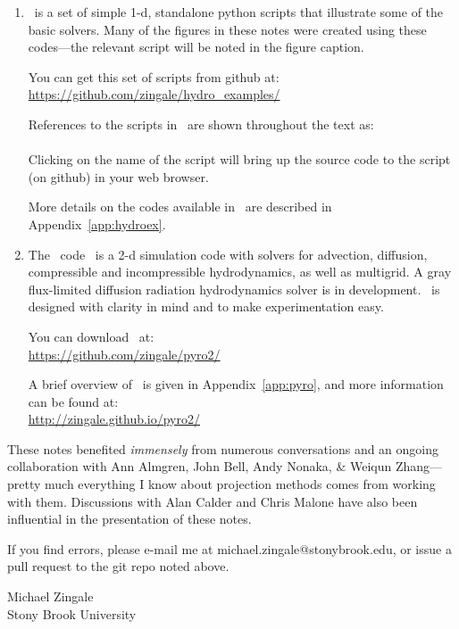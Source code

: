 \begin{enumerate}
\item \hydroex\ is a set of simple 1-d, standalone python scripts
  that illustrate some of the basic solvers.  Many of the figures
  in these notes were created using these codes---the relevant
  script will be noted in the figure caption.  

  You can get this set of scripts from github at:\\
  \url{https://github.com/zingale/hydro_examples/}

  References to the scripts in \hydroex\ are shown throughout
  the text as: \\[0.5em]
   \\[0.5em]
  Clicking on the name of the script will bring up the source code
  to the script (on github) in your web browser.

  More details on the codes available in \hydroex\ are described
  in Appendix~\ref{app:hydroex}.

\item  
  The \pyro\ code~\cite{pyro} is a 2-d simulation code with
  solvers for advection, diffusion, compressible and incompressible
  hydrodynamics, as well as multigrid.  A gray flux-limited diffusion
  radiation hydrodynamics solver is
  in development.  \pyro\ is designed with clarity in mind and to make 
  experimentation easy.  

  You can download \pyro\ at: \\
  \url{https://github.com/zingale/pyro2/} 

  A brief overview of \pyro\ is given in Appendix~\ref{app:pyro},
  and more information can be found at: \\
\url{http://zingale.github.io/pyro2/}
\end{enumerate}

These notes benefited {\em immensely} from numerous conversations and
an ongoing collaboration with Ann Almgren, John Bell, Andy Nonaka, \&
Weiqun Zhang---pretty much everything I know about projection methods
comes from working with them.  Discussions with Alan Calder and Chris
Malone have also been influential in the presentation of these notes.

If you find errors, please e-mail me at michael.zingale@stonybrook.edu,
or issue a pull request to the git repo noted above.  



\begin{flushright}
Michael Zingale \\
Stony Brook University
\end{flushright}



